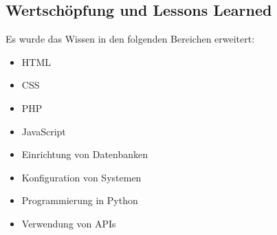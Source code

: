 \subsection{Wertschöpfung und Lessons Learned}
Es wurde das Wissen in den folgenden Bereichen erweitert: \\
\begin{itemize}
	\item HTML
\end{itemize}
\begin{itemize}
	\item CSS
\end{itemize}
\begin{itemize}
	\item PHP
\end{itemize}
\begin{itemize}
	\item JavaScript
\end{itemize}
\begin{itemize}
	\item Einrichtung von Datenbanken
\end{itemize}
\begin{itemize}
	\item Konfiguration von Systemen
\end{itemize} 
\begin{itemize}
	\item Programmierung in Python
\end{itemize}
 \begin{itemize}
 	\item Verwendung von APIs
 \end{itemize}

\label{\docname}

